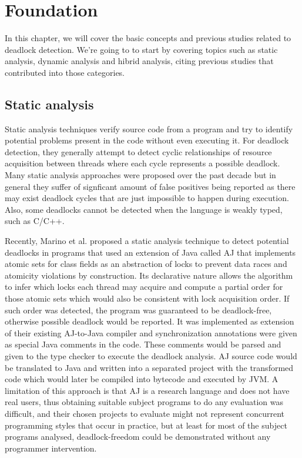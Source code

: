 \section{Foundation}

In this chapter, we will cover the basic concepts and previous studies related to deadlock detection. We're going to to start by covering topics such as static analysis, dynamic analysis and hibrid analysis, citing previous studies that contributed into those categories.

\subsection{Static analysis}

Static analysis techniques verify source code from a program and try to identify potential problems present in the code without even executing it.
For deadlock detection, they generally attempt to detect cyclic relationships of resource acquisition between threads where each cycle represents a possible deadlock.
Many static analysis approaches were proposed over the past decade \cite{dawson}\cite{chand}\cite{vivek}\cite{praun}\cite{cormac}\cite{williams}
but in general they suffer of signficant amount of false positives being reported as there may exist deadlock cycles that are just impossible to happen during execution.
Also, some deadlocks cannot be detected when the language is weakly typed, such as C/C++.

Recently, Marino et al. \cite{marino} proposed a static analysis technique to detect potential deadlocks in programs that
used an extension of Java called AJ that implements atomic sets for class fields as an abstraction of locks to prevent data races
and atomicity violations by construction. Its declarative nature allows the algorithm to infer which locks each thread may acquire and
compute a partial order for those atomic sets which would also be consistent with lock acquisition order.
If such order was detected, the program was guaranteed to be deadlock-free, otherwise possible deadlock would be reported.
It was implemented as extension of their existing AJ-to-Java compiler and synchronization annotations were given as special Java comments in the code.
These comments would be parsed and given to the type checker to execute the deadlock analysis. AJ source code would be translated to Java and written into a separated project
with the transformed code which would later be compiled into bytecode and executed by JVM. A limitation of this approach is that AJ is a research language
and does not have real users, thus obtaining suitable subject programs to do any evaluation was difficult, and their chosen projects to evaluate might not
represent concurrent programming styles that occur in practice, but at least for most of the subject programs analysed, deadlock-freedom could be demonstrated
without any programmer intervention.

